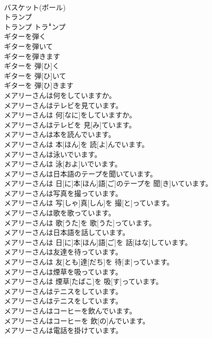 \documentclass[8pt]{extreport}
\begin{document}
\begin{CJK}{UTF8}{min}
\\	バスケット(ボール)	
\\	トランプ	
\\	トランプ	トラꜜンプ
\\	ギターを弾く 
\\	ギターを弾いて 
\\	ギターを弾きます	
\\	ギターを 弾[ひ]く 
\\	ギターを 弾[ひ]いて 
\\	ギターを 弾[ひ]きます
\\	メアリーさんは何をしていますか。 
\\	メアリーさんはテレビを見ています。	
\\	メアリーさんは 何[なに]をしていますか。 
\\	メアリーさんはテレビを 見[み]ています。
\\	メアリーさんは本を読んでいます。	
\\	メアリーさんは 本[ほん]を 読[よ]んでいます。
\\	メアリーさんは泳いでいます。	
\\	メアリーさんは 泳[およ]いでいます。
\\	メアリーさんは日本語のテープを聞いています。	
\\	メアリーさんは 日[に]本[ほん]語[ご]のテープを 聞[き]いています。
\\	メアリーさんは写真を撮っています。	
\\	メアリーさんは 写[しゃ]真[しん]を 撮[と]っています。
\\	メアリーさんは歌を歌っています。	
\\	メアリーさんは 歌[うた]を 歌[うた]っています。
\\	メアリーさんは日本語を話しています。	
\\	メアリーさんは 日[に]本[ほん]語[ご]を 話[はな]しています。
\\	メアリーさんは友達を待っています。	
\\	メアリーさんは 友[とも]達[だち]を 待[ま]っています。
\\	メアリーさんは煙草を吸っています。	
\\	メアリーさんは 煙草[たばこ]を 吸[す]っています。
\\	メアリーさんはテニスをしています。	
\\	メアリーさんはテニスをしています。
\\	メアリーさんはコーヒーを飲んでいます。	
\\	メアリーさんはコーヒーを 飲[の]んでいます。
\\	メアリーさんは電話を掛けています。	

\end{CJK}
\end{document}

